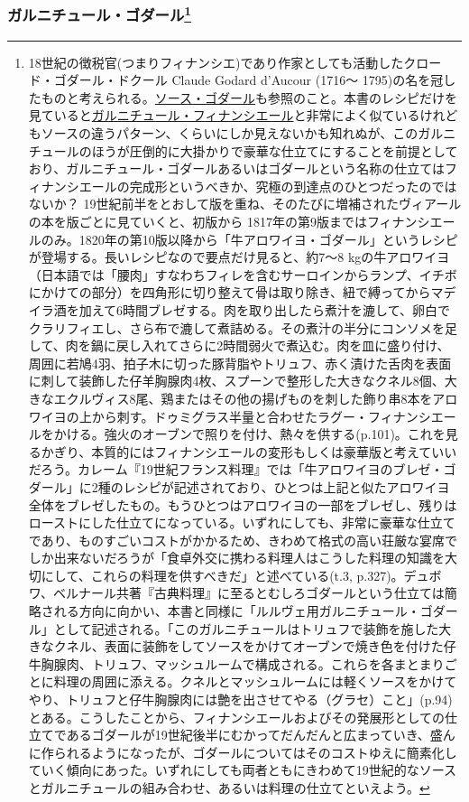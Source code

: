 \begin{recette}
{\subsubsection[ガルニチュール・ゴダール]{\texorpdfstring{ガルニチュール・ゴダール\footnote{18世紀の徴税官(つまりフィナンシエ)であり作家としても活動したクロード・ゴダール・ドクール
  Claude Godard d'Aucour (1716〜
  1795)の名を冠したものと考えられる。\protect\hyperlink{sauce-godard}{ソース・ゴダール}も参照のこと。本書のレシピだけを見ていると\protect\hyperlink{garniture-a-la-financiere}{ガルニチュール・フィナンシエール}と非常によく似ているけれどもソースの違うパターン、くらいにしか見えないかも知れぬが、このガルニチュールのほうが圧倒的に大掛かりで豪華な仕立てにすることを前提としており、ガルニチュール・ゴダールあるいはゴダールという名称の仕立てはフィナンシエールの完成形というべきか、究極の到達点のひとつだったのではないか？
  19世紀前半をとおして版を重ね、そのたびに増補されたヴィアールの本を版ごとに見ていくと、初版から
  1817年の第9版まではフィナンシエールのみ。1820年の第10版以降から「牛アロワイヨ・ゴダール」というレシピが登場する。長いレシピなので要点だけ見ると、約7〜8
  kgの牛アロワイヨ（日本語では「腰肉」すなわちフィレを含むサーロインからランプ、イチボにかけての部分）を四角形に切り整えて骨は取り除き、紐で縛ってからマデイラ酒を加えて6時間ブレゼする。肉を取り出したら煮汁を漉して、卵白でクラリフィエし、さら布で漉して煮詰める。その煮汁の半分にコンソメを足して、肉を鍋に戻し入れてさらに2時間弱火で煮込む。肉を皿に盛り付け、周囲に若鳩4羽、拍子木に切った豚背脂やトリュフ、赤く漬けた舌肉を表面に刺して装飾した仔羊胸腺肉4枚、スプーンで整形した大きなクネル8個、大きなエクルヴィス8尾、鶏またはその他の揚げものを刺した飾り串8本をアロワイヨの上から刺す。ドゥミグラス半量と合わせたラグー・フィナンシエールをかける。強火のオーブンで照りを付け、熱々を供する(p.101)。これを見るかぎり、本質的にはフィナンシエールの変形もしくは豪華版と考えていいだろう。カレーム『19世紀フランス料理』では「牛アロワイヨのブレゼ・ゴダール」に2種のレシピが記述されており、ひとつは上記と似たアロワイヨ全体をブレゼしたもの。もうひとつはアロワイヨの一部をブレゼし、残りはローストにした仕立てになっている。いずれにしても、非常に豪華な仕立てであり、ものすごいコストがかかるため、きわめて格式の高い荘厳な宴席でしか出来ないだろうが「食卓外交に携わる料理人はこうした料理の知識を大切にして、これらの料理を供すべきだ」と述べている(t.3,
  p.327)。デュボワ、ベルナール共著『古典料理』に至るとむしろゴダールという仕立ては簡略される方向に向かい、本書と同様に「ルルヴェ用ガルニチュール・ゴダール」として記述される。「このガルニチュールはトリュフで装飾を施した大きなクネル、表面に装飾をしてソースをかけてオーブンで焼き色を付けた仔牛胸腺肉、トリュフ、マッシュルームで構成される。これらを各まとまりごとに料理の周囲に添える。クネルとマッシュルームには軽くソースをかけてやり、トリュフと仔牛胸腺肉には艶を出させてやる（グラセ）こと」(p.94)とある。こうしたことから、フィナンシエールおよびその発展形としての仕立てであるゴダールが19世紀後半にむかってだんだんと広まっていき、盛んに作られるようになったが、ゴダールについてはそのコストゆえに簡素化していく傾向にあった。いずれにしても両者ともにきわめて19世紀的なソースとガルニチュールの組み合わせ、あるいは料理の仕立てといえよう。}}{ガルニチュール・ゴダール}}\label{garniture-Godard}}


\end{recette}
